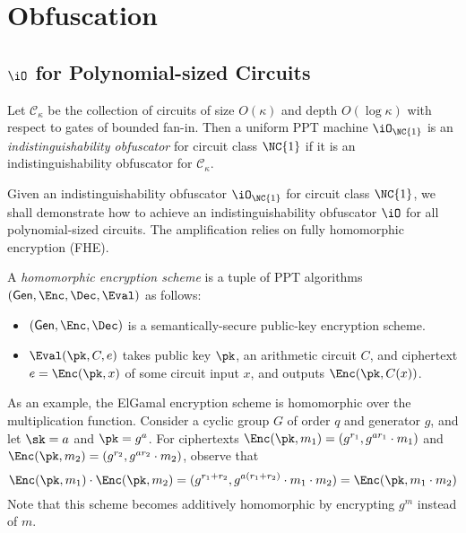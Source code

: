 \newcommand{\cO}{\ensuremath{\mathcal{O}}}
\newcommand{\Ck}{\mathcal{C}_{\kappa}}


\chapter{Obfuscation}
\section{$\iO$ for Polynomial-sized Circuits}


\begin{definition}
Let $\Ck$ be the collection of circuits of size $O(\kappa)$ and depth
$O(\log{\kappa})$ with respect to gates of bounded fan-in.
Then a uniform PPT machine $\iO_{\NC{1}}$ is an
\emph{indistinguishability obfuscator} for circuit class $\NC{1}$ if it
is an indistinguishability obfuscator for $\Ck$.
\end{definition}

Given an indistinguishability obfuscator $\iO_{\NC{1}}$ for circuit
class $\NC{1}$, we shall demonstrate how to achieve an
indistinguishability obfuscator $\iO$ for all polynomial-sized circuits.
The amplification relies on fully homomorphic encryption (FHE).

\newcommand{\GEN}{\ensuremath{\mathsf{Gen}}}

\begin{definition}
A \emph{homomorphic encryption scheme} is a tuple of PPT algorithms
$(\GEN, \Enc, \Dec, \Eval)$ as follows:
\begin{itemize}
\item
	$(\GEN, \Enc, \Dec)$ is a semantically-secure public-key
	encryption scheme.
\item
	$\Eval(\pk, C, e)$ takes public key $\pk$, an arithmetic circuit
	$C$, and ciphertext $e = \Enc(\pk, x)$ of some circuit input
	$x$, and outputs $\Enc(\pk, C(x))$.
\end{itemize}
\end{definition}

As an example, the ElGamal encryption scheme is homomorphic over the multiplication function.
Consider a cyclic group $G$ of order $q$ and generator $g$, and let
$\sk = a$ and $\pk = g^a$.
For ciphertexts $\Enc(\pk, m_1) = (g^{r_1}, g^{a r_1} \cdot m_1)$
and $\Enc(\pk, m_2) = (g^{r_2}, g^{a r_2} \cdot m_2)$, observe that
\begin{equation*}
\Enc(\pk, m_1) \cdot \Enc(\pk, m_2) = (g^{r_1 + r_2}, g^{a (r_1 + r_2)}
\cdot m_1 \cdot m_2) = \Enc(\pk, m_1 \cdot m_2)
\end{equation*}
Note that this scheme becomes additively homomorphic by encrypting $g^m$
instead of $m$.

